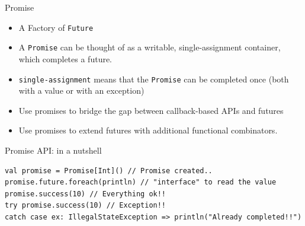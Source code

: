 \documentclass[presentation, 9pt]{beamer}\mode<presentation>{\usetheme{AMSBolognaFC}}
\begin{document}
\begin{frame}[fragile]{Promise}
\begin{itemize}
	\item A Factory of \texttt{Future}
 	\item A \texttt{Promise} can be thought of as a writable, single-assignment container, which completes a future.
  \item \texttt{single-assignment} means that the \texttt{Promise} can be completed once (both with a value or with an exception)
  \item Use promises to bridge the gap between callback-based APIs and futures
  \item Use promises to extend futures with additional functional combinators. 
\end{itemize}
\begin{alertblock}{Promise API: in a nutshell}
	\begin{tcolorbox}[left=0pt, top=0pt, bottom=0pt]
		\begin{verbatim}
val promise = Promise[Int]() // Promise created..
promise.future.foreach(println) // "interface" to read the value
promise.success(10) // Everything ok!!
try promise.success(10) // Exception!!
catch case ex: IllegalStateException => println("Already completed!!")
		\end{verbatim}
	\end{tcolorbox}
\end{alertblock}
\end{frame}
\end{document}
